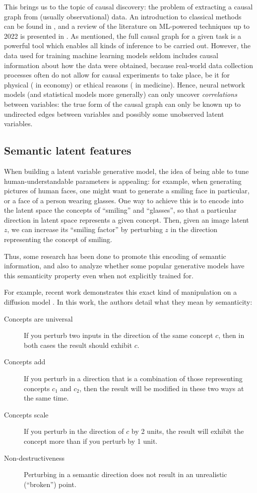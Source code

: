 \documentclass[../main.tex]{subfiles}
\begin{document}
This brings us to the topic of causal discovery: the problem of extracting a causal graph from (usually observational) data.
An introduction to classical methods can be found in \cite{cunninghamCausal2021}, and a review of the literature on ML-powered techniques up to 2022 is presented in \cite{vowelsYa2023}.
As mentioned, the full causal graph for a given task is a powerful tool which enables all kinds of inference to be carried out.
However, the data used for training machine learning models seldom includes causal information about how the data were obtained, because real-world data collection processes often do not allow for causal experiments to take place, be it for physical (\eg{} in economy) or ethical reasons (\eg{} in medicine).
Hence, neural network models (and statistical models more generally) can only uncover \emph{correlations} between variables: the true form of the causal graph can only be known up to undirected edges between variables and possibly some unobserved latent variables.

\subsection{Semantic latent features}

When building a latent variable generative model, the idea of being able to tune human-understandable parameters is appealing: for example, when generating pictures of human faces, one might want to generate a smiling face in particular, or a face of a person wearing glasses.
One way to achieve this is to encode into the latent space the concepts of ``smiling'' and ``glasses'', so that a particular direction in latent space represents a given concept.
Then, given an image latent $z$, we can increase its ``smiling factor'' by perturbing $z$ in the direction representing the concept of smiling.

Thus, some research has been done to promote this encoding of semantic information, and also to analyze whether some popular generative models have this semanticity property even when not explicitly trained for.

For example, recent work demonstrates this exact kind of manipulation on a diffusion model \cite{kwonDiffusion2023}.
In this work, the authors detail what they mean by semanticity:
\begin{description}
	\item[Concepts are universal] If you perturb two inputs in the direction of the same concept $c$, then in both cases the result should exhibit $c$.
	\item[Concepts add] If you perturb in a direction that is a combination of those representing concepts $c_1$ and $c_2$, then the result will be modified in these two ways at the same time.
	\item[Concepts scale] If you perturb in the direction of $c$ by 2 units, the result will exhibit the concept more than if you perturb by 1 unit.
	\item[Non-destructiveness] Perturbing in a semantic direction does not result in an unrealistic (``broken'') point.
\end{description}
\end{document}
